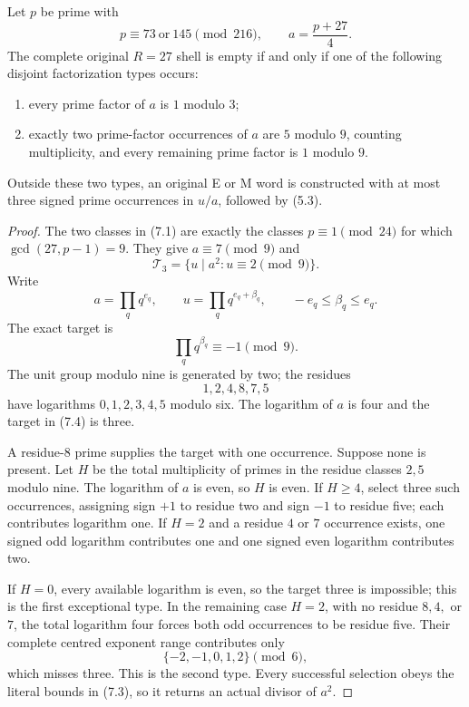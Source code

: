 \begin{theorem}\label{thm:R27}
Let $p$ be prime with
\[
 \boxed{p\equiv73\ \text{or}\ 145\pmod{216}},\qquad
 a=\frac{p+27}{4}.                                               \tag{7.1}
\]
The complete original $R=27$ shell is empty if and only if one of the following
disjoint factorization types occurs:
\begin{enumerate}
\item every prime factor of $a$ is $1$ modulo $3$;
\item exactly two prime-factor occurrences of $a$ are $5$ modulo $9$, counting
multiplicity, and every remaining prime factor is $1$ modulo $9$.
\end{enumerate}
Outside these two types, an original E or M word is constructed with at most
three signed prime occurrences in $u/a$, followed by (5.3).
\end{theorem}

\begin{proof}
The two classes in (7.1) are exactly the classes $p\equiv1\pmod{24}$ for which
$\gcd(27,p-1)=9$.  They give $a\equiv7\pmod9$ and
\[
 \mathcal T_3=\{u\mid a^2:u\equiv2\pmod9\}.                    \tag{7.2}
\]
Write
\[
 a=\prod_q q^{e_q},\qquad
 u=\prod_q q^{e_q+\beta_q},\qquad -e_q\le\beta_q\le e_q.      \tag{7.3}
\]
The exact target is
\[
 \prod_q q^{\beta_q}\equiv-1\pmod9.                            \tag{7.4}
\]
The unit group modulo nine is generated by two; the residues
\[
 1,2,4,8,7,5
\]
have logarithms $0,1,2,3,4,5$ modulo six.  The logarithm of $a$ is four and
the target in (7.4) is three.

A residue-$8$ prime supplies the target with one occurrence.  Suppose none is
present.  Let $H$ be the total multiplicity of primes in the residue classes
$2,5$ modulo nine.  The logarithm of $a$ is even, so $H$ is even.  If $H\ge4$,
select three such occurrences, assigning sign $+1$ to residue two and sign
$-1$ to residue five; each contributes logarithm one.  If $H=2$ and a residue
$4$ or $7$ occurrence exists, one signed odd logarithm contributes one and one
signed even logarithm contributes two.

If $H=0$, every available logarithm is even, so the target three is impossible;
this is the first exceptional type.  In the remaining case $H=2$, with no
residue $8,4,$ or $7$, the total logarithm four forces both odd occurrences to
be residue five.  Their complete centred exponent range contributes only
\[
 \{-2,-1,0,1,2\}\pmod6,
\]
which misses three.  This is the second type.  Every successful selection obeys
the literal bounds in (7.3), so it returns an actual divisor of $a^2$.
\end{proof}

